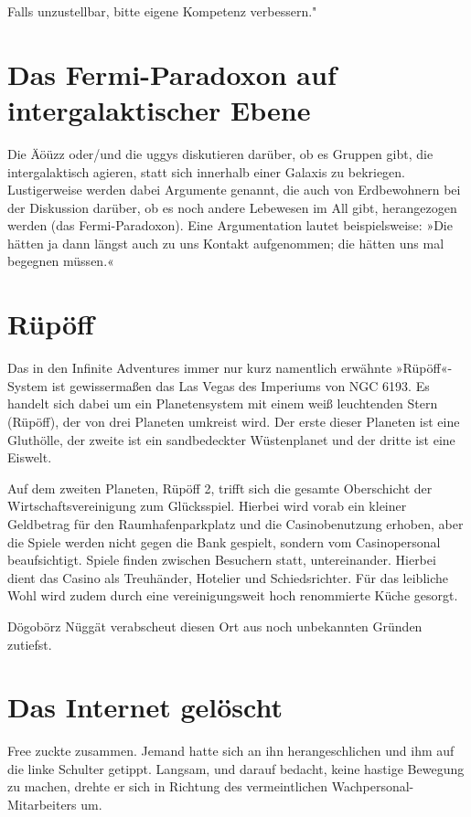 Falls unzustellbar, bitte eigene Kompetenz verbessern."


\section{Das Fermi-Paradoxon auf intergalaktischer Ebene}

Die Äöüzz oder/und die uggys diskutieren darüber, ob es Gruppen gibt, die intergalaktisch agieren, statt sich innerhalb einer Galaxis zu bekriegen. Lustigerweise werden dabei Argumente genannt, die auch von Erdbewohnern bei der Diskussion darüber, ob es noch andere Lebewesen im All gibt, herangezogen werden (das Fermi-Paradoxon). Eine Argumentation lautet beispielsweise: »Die hätten ja dann längst auch zu uns Kontakt aufgenommen; die hätten uns mal begegnen müssen.«


\section{Rüpöff}

Das in den Infinite Adventures immer nur kurz namentlich erwähnte »Rüpöff«-System ist gewissermaßen das Las Vegas des Imperiums von NGC 6193. Es handelt sich dabei um ein Planetensystem mit einem weiß leuchtenden Stern (Rüpöff), der von drei Planeten umkreist wird. Der erste dieser Planeten ist eine Gluthölle, der zweite ist ein sandbedeckter Wüstenplanet und der dritte ist eine Eiswelt.

Auf dem zweiten Planeten, Rüpöff 2, trifft sich die gesamte Oberschicht der Wirtschaftsvereinigung zum Glücksspiel. Hierbei wird vorab ein kleiner Geldbetrag für den Raumhafenparkplatz und die Casinobenutzung erhoben, aber die Spiele werden nicht gegen die Bank gespielt, sondern vom Casinopersonal beaufsichtigt. Spiele finden zwischen Besuchern statt, untereinander. Hierbei dient das Casino als Treuhänder, Hotelier und Schiedsrichter. Für das leibliche Wohl wird zudem durch eine vereinigungsweit hoch renommierte Küche gesorgt.

Dögobörz Nüggät verabscheut diesen Ort aus noch unbekannten Gründen zutiefst.


\section{Das Internet gelöscht}

Free zuckte zusammen. Jemand hatte sich an ihn herangeschlichen und ihm auf die linke Schulter getippt. Langsam, und darauf bedacht, keine hastige Bewegung zu machen, drehte er sich in Richtung des vermeintlichen Wachpersonal-Mitarbeiters um.


